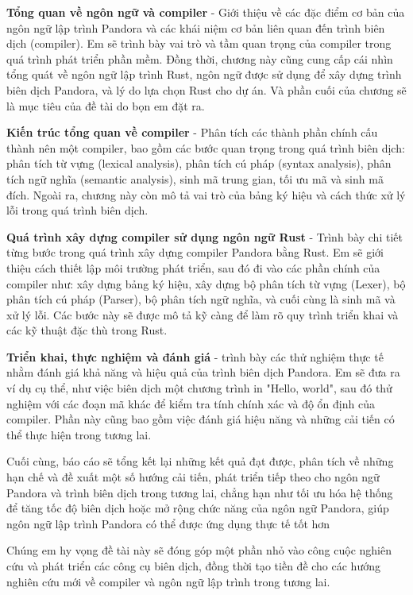\begin{mucluc}
    
    \item {\bf{Tổng quan về ngôn ngữ và compiler}} - 
        Giới thiệu về các đặc điểm cơ bản của ngôn ngữ lập trình 
        Pandora và các khái niệm cơ bản liên quan đến trình biên dịch 
        (compiler). Em sẽ trình bày vai trò và tầm quan trọng của compiler 
        trong quá trình phát triển phần mềm. Đồng thời, chương này cũng 
        cung cấp cái nhìn tổng quát về ngôn ngữ lập trình Rust, ngôn ngữ 
        được sử dụng để xây dựng trình biên dịch Pandora, và 
        lý do lựa chọn Rust cho dự án. Và phần cuối của chương sẽ là mục
        tiêu của đề tài do bọn em đặt ra.
    \item {\bf{Kiến trúc tổng quan về compiler}} - 
        Phân tích các thành phần chính cấu thành nên một compiler, 
        bao gồm các bước quan trọng trong quá trình biên dịch: phân tích 
        từ vựng (lexical analysis), phân tích cú pháp (syntax analysis), 
        phân tích ngữ nghĩa (semantic analysis), sinh mã trung gian, 
        tối ưu mã và sinh mã đích. Ngoài ra, chương này còn mô tả vai 
        trò của bảng ký hiệu và cách thức xử lý lỗi trong quá trình biên 
        dịch.
    \item {\bf{Quá trình xây dựng compiler sử dụng ngôn ngữ Rust}} - 
        Trình bày chi tiết từng bước trong quá trình xây dựng compiler 
        Pandora bằng Rust. Em sẽ giới thiệu cách thiết lập môi trường 
        phát triển, sau đó đi vào các phần chính của compiler như: 
        xây dựng bảng ký hiệu, xây dựng bộ phân tích từ vựng (Lexer), 
        bộ phân tích cú pháp (Parser), bộ phân tích ngữ nghĩa, và cuối 
        cùng là sinh mã và xử lý lỗi. Các bước này sẽ được mô tả kỹ càng 
        để làm rõ quy trình triển khai và các kỹ thuật đặc thù trong Rust.
    \item {\bf{Triển khai, thực nghiệm và đánh giá}} - 
        trình bày các thử nghiệm thực tế nhằm đánh giá khả năng và hiệu quả 
        của trình biên dịch Pandora. Em sẽ đưa ra ví dụ cụ thể, như việc 
        biên dịch một chương trình in "Hello, world", sau đó thử nghiệm 
        với các đoạn mã khác để kiểm tra tính chính xác và độ ổn định của 
        compiler. Phần này cũng bao gồm việc đánh giá hiệu năng và những 
        cải tiến có thể thực hiện trong tương lai.
\end{mucluc}

Cuối cùng, báo cáo sẽ tổng kết lại những kết quả đạt được, phân tích về những
hạn chế và đề xuất một số hướng cải tiến, phát triển tiếp theo cho ngôn ngữ Pandora và 
trình biên dịch  trong tương lai, chẳng hạn như tối ưu hóa hệ thống để tăng tốc độ biên 
dịch hoặc mở rộng chức năng của ngôn ngữ Pandora, giúp ngôn ngữ lập trình Pandora có thể 
được ứng dụng thực tế tốt hơn

Chúng em hy vọng đề tài này sẽ đóng góp một phần nhỏ vào công cuộc nghiên cứu và phát 
triển các công cụ biên dịch, đồng thời tạo tiền đề cho các hướng nghiên cứu mới về 
compiler và ngôn ngữ lập trình trong tương lai.

